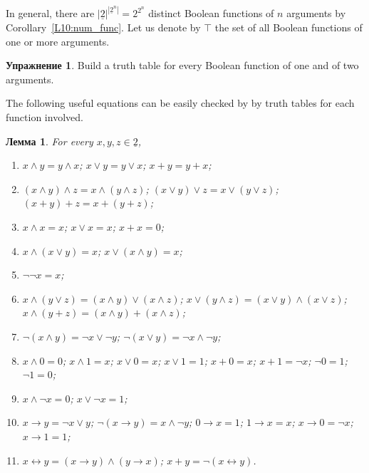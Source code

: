 \documentclass[12pt,notitlepage]{article}
\theoremstyle{plain}
\newtheorem{lemma}[thm]{Лемма}
\theoremstyle{definition}
\newtheorem{exc}[thm]{Упражнение}
\theoremstyle{plain}
\newcommand{\ul}[1]{\underline{#1}}
\newcommand{\1}{\mathbf{1}}
\newcommand{\0}{\mathbf{0}}
\begin{document}
In general, there are $|\ul{2}|^{|\ul{2}^n|} = 2^{2^n}$ distinct Boolean functions of $n$ arguments by Corollary~\ref{L10:num_func}. Let us denote by $\top$ the set of all Boolean functions of one or more arguments.

\begin{exc}
	Build a truth table for every Boolean function of one and of two arguments.
\end{exc}

\noindent The following useful equations can be easily checked by by truth tables for each function involved.
\begin{lemma}\label{L15:bool_eq1}
	For every $x,y,z \in \ul{2}$,
	\begin{enumerate}
		\item $x \wedge y = y \wedge x$; $x \vee y = y \vee x$; $x + y = y + x$;
		\item $(x \wedge y) \wedge z = x \wedge (y \wedge z)$; $(x \vee y) \vee z = x \vee (y \vee z)$; $(x + y) + z = x + (y + z)$;
		\item $x \wedge x = x$; $x \vee x = x$; $x + x = 0$;
		\item $x \wedge (x \vee y) = x$; $x \vee (x \wedge y) = x$;
		\item $\neg\neg x = x$;
		\item $x \wedge (y \vee z) = (x \wedge y) \vee (x\wedge z)$; $x \vee (y \wedge z) = (x\vee y) \wedge (x \vee z)$; $x \wedge (y + z) = (x\wedge y) + (x \wedge z)$;
		\item $\neg(x\wedge y) = \neg x \vee \neg y$; $\neg(x \vee y) = \neg x \wedge \neg y$;
		\item $x \wedge 0 = 0$; $x \wedge 1 = x$; $x\vee 0 = x$; $x \vee 1 = 1$; $x + 0 = x$; $x + 1 = \neg x$; $\neg 0 = 1$; $\neg 1 = 0$;
		\item $x \wedge \neg x = 0$; $x \vee \neg x = 1$;
		\item $x \to y = \neg x \vee y$; $\neg(x \to y) = x \wedge \neg y$; $0 \to x = 1$; $1 \to x = x$; $x \to 0 = \neg x$; $x \to 1 = 1$;
		\item $x \leftrightarrow y = (x \to y) \wedge (y \to x)$; $x + y = \neg (x \leftrightarrow y)$.
	\end{enumerate}
\end{lemma}
\end{document}
